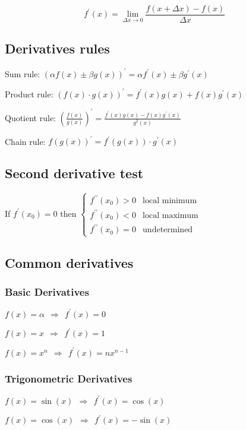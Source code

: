 \[
f^\prime(x) = \lim_{\Delta x \rightarrow 0} \frac{ f( x + \Delta x ) - f(x) }{\Delta x}
\]

\subsection{Derivatives rules}

Sum rule: $ (\alpha f(x) \pm \beta g(x) )^\prime = \alpha f^\prime(x) \pm \beta g^\prime(x) $ 

Product rule: $ (f(x) \cdot g(x) )^\prime = f^\prime(x) g(x) + f(x) g^\prime(x)$

Quotient rule: $ \left( \frac{f(x)}{g(x)} \right)^\prime = \frac{ f^\prime(x) g(x) - f(x) g^\prime(x) }{ g^2(x) } $

Chain rule: $ f\left( g(x) \right) ^\prime = f^\prime\left( g(x) \right) \cdot g^\prime(x) $



\subsection{Second derivative test}

If $ f^\prime(x_0) = 0 $ then $ \begin{cases}
									f^{\prime\prime}(x_0) > 0 & \text{local minimum} \\
									f^{\prime\prime}(x_0) < 0 & \text{local maximum} \\
									f^{\prime\prime}(x_0) = 0 & \text{undetermined}
								\end{cases}
$

\subsection{Common derivatives}
\subsubsection{Basic Derivatives}
$ f(x)=\alpha ~~ \Rightarrow ~~ f^\prime(x)=0 $

$ f(x)=x ~~ \Rightarrow ~~ f^\prime(x)=1 $

$ f(x)=x^n ~~ \Rightarrow ~~ f^\prime(x)=n x^{n-1} $

\subsubsection{Trigonometric Derivatives}
$ f(x)=\sin(x) ~~ \Rightarrow ~~ f^\prime(x)=\cos(x) $

$ f(x)=\cos(x) ~~ \Rightarrow ~~ f^\prime(x)=-\sin(x) $

